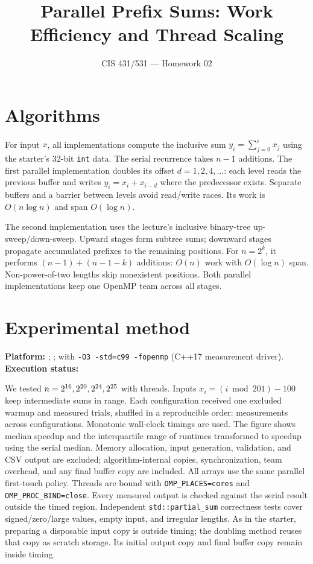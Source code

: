 \documentclass[sigconf,nonacm]{acmart}
\title{Parallel Prefix Sums: Work Efficiency and Thread Scaling}
\author{CIS 431/531 --- Homework 02}
\date{}
\begin{document}
\maketitle
\thispagestyle{empty}

\section{Algorithms}
For input $x$, all implementations compute the inclusive sum
$y_i=\sum_{j=0}^{i}x_j$ using the starter's 32-bit \texttt{int} data. The serial recurrence takes
$n-1$ additions. The first parallel implementation doubles its offset
$d=1,2,4,\ldots$: each level reads the previous buffer and writes
$y_i=x_i+x_{i-d}$ where the predecessor exists. Separate buffers and a
barrier between levels avoid read/write races. Its work is $O(n\log n)$
and span $O(\log n)$.

The second implementation uses the lecture's inclusive binary-tree
up-sweep/down-sweep. Upward stages form subtree sums; downward stages
propagate accumulated prefixes to the remaining positions. For
$n=2^k$, it performs $(n-1)+(n-1-k)$ additions: $O(n)$ work with
$O(\log n)$ span. Non-power-of-two lengths skip nonexistent positions.
Both parallel implementations keep one OpenMP team across all stages.

\section{Experimental method}
\textbf{Platform:} \ExperimentPlatform{}; \ExperimentCPU{};
\ExperimentCompiler{} with \texttt{-O3 -std=c99 -fopenmp}
(C++17 measurement driver).
\textbf{Execution status:} \RunStatus{}

We tested $n=2^{16}, 2^{20}, 2^{24}, 2^{25}$ with \ThreadCounts{} threads.
Inputs $x_i=(i\bmod201)-100$ keep intermediate sums in range.
Each configuration received one excluded warmup and \TrialCount{}
measured trials, shuffled in a reproducible order: \MeasurementCount{}
measurements across \ConfigurationCount{} configurations.
Monotonic wall-clock timings are used. The figure shows
median speedup and the interquartile range of runtimes transformed to
speedup using the serial median. Memory allocation, input generation,
validation, and CSV output are excluded; algorithm-internal copies, synchronization,
team overhead, and any final buffer copy are included. All arrays use
the same parallel first-touch policy. Threads are bound with
\texttt{OMP\_PLACES=cores} and \texttt{OMP\_PROC\_BIND=close}.
Every measured output is checked against the serial result outside
the timed region. Independent \texttt{std::partial\_sum} correctness
tests cover signed/zero/large values, empty input, and irregular lengths.
As in the starter, preparing a disposable input copy is outside timing;
the doubling method reuses that copy as scratch storage. Its initial
output copy and final buffer copy remain inside timing.
\end{document}
